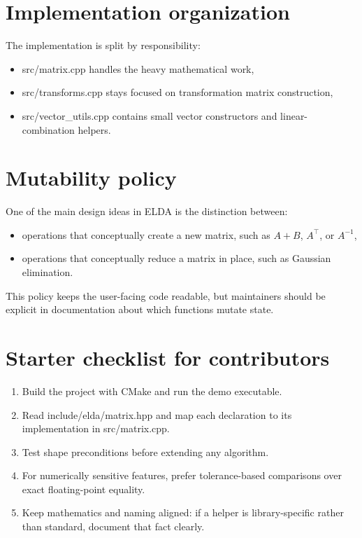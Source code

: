 \documentclass[11pt,a4paper,openany]{book}
\def\code#1{#1}%
\DeclareRobustCommand{\code}[1]{\texttt{\detokenize{#1}}}
\begin{document}
\section{Implementation organization}
The implementation is split by responsibility:
\begin{itemize}
    \item \code{src/matrix.cpp} handles the heavy mathematical work,
    \item \code{src/transforms.cpp} stays focused on transformation matrix construction,
    \item \code{src/vector_utils.cpp} contains small vector constructors and linear-combination helpers.
\end{itemize}

\section{Mutability policy}
One of the main design ideas in ELDA is the distinction between:
\begin{itemize}
    \item operations that conceptually create a new matrix, such as \(A+B\), \(A^\top\), or \(A^{-1}\),
    \item operations that conceptually reduce a matrix in place, such as Gaussian elimination.
\end{itemize}
This policy keeps the user-facing code readable, but maintainers should be explicit in documentation about which functions mutate state.

\section{Starter checklist for contributors}
\begin{enumerate}[label=\arabic*.]
    \item Build the project with CMake and run the demo executable.
    \item Read \code{include/elda/matrix.hpp} and map each declaration to its implementation in \code{src/matrix.cpp}.
    \item Test shape preconditions before extending any algorithm.
    \item For numerically sensitive features, prefer tolerance-based comparisons over exact floating-point equality.
    \item Keep mathematics and naming aligned: if a helper is library-specific rather than standard, document that fact clearly.
\end{enumerate}
\end{document}
